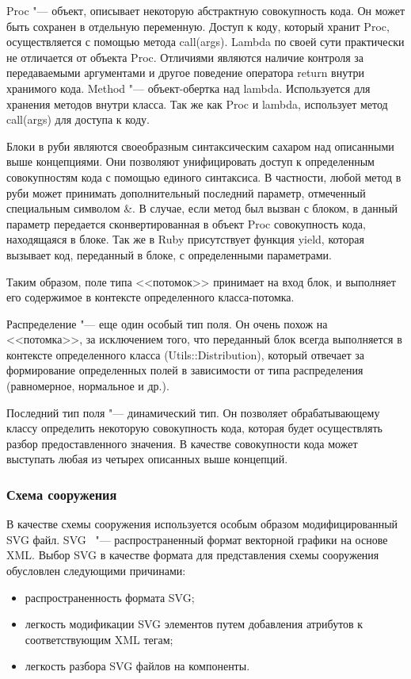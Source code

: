 Proc "--- объект, описывает некоторую абстрактную совокупность кода. Он может быть сохранен в отдельную переменную. Доступ к коду, который хранит Proc, осуществляется с помощью метода call(args).
Lambda по своей сути практически не отличается от объекта Proc. Отличиями являются наличие контроля за передаваемыми аргументами и другое поведение оператора return внутри хранимого кода.
Method "--- объект-обертка над lambda. Используется для хранения методов внутри класса. Так же как Proc и lambda, использует метод call(args) для доступа к коду.

Блоки в руби являются своеобразным синтаксическим сахаром над описанными выше концепциями.
Они позволяют унифицировать доступ к определенным совокупностям кода с помощью единого синтаксиса.
В частности, любой метод в руби может принимать дополнительный последний параметр, отмеченный специальным символом \&.
В случае, если метод был вызван с блоком, в данный параметр передается сконвертированная в объект Proc совокупность кода, находящаяся в блоке.
Так же в Ruby присутствует функция yield, которая вызывает код, переданный в блоке, с определенными параметрами.

Таким образом, поле типа <<потомок>> принимает на вход блок, и выполняет его содержимое в контексте определенного класса-потомка.

Распределение "--- еще один особый тип поля. Он очень похож на <<потомка>>, за исключением того, что переданный блок всегда выполняется в контексте определенного класса (Utils::Distribution),
который отвечает за формирование определенных полей в зависимости от типа распределения (равномерное, нормальное и др.).

Последний тип поля "--- динамический тип. Он позволяет обрабатывающему классу определить некоторую совокупность кода, которая будет осуществлять разбор предоставленного значения.
В качестве совокупности кода может выступать любая из четырех описанных выше концепций.

\subsubsection{Схема сооружения}
\label{sec:development:preprocessor:svg_scheme}

В качестве схемы сооружения используется особым образом модифицированный SVG файл.
SVG~\cite{svg_home} "--- распространенный формат векторной графики на основе XML.
Выбор SVG в качестве формата для представления схемы сооружения обусловлен следующими причинами:
\begin{itemize}
  \item распространенность формата SVG;
  \item легкость модификации SVG элементов путем добавления атрибутов к соответствующим XML тегам;
  \item легкость разбора SVG файлов на компоненты.
\end{itemize}

